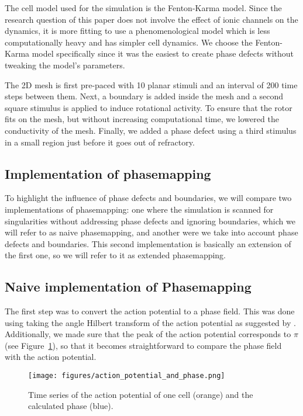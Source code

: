 \documentclass[twocolumn]{article}
\begin{document}
The cell model used for the simulation is the Fenton-Karma model. Since
the research question of this paper does not involve the effect of ionic
channels on the dynamics, it is more fitting to use a phenomenological
model which is less computationally heavy and has simpler cell dynamics.
We choose the Fenton-Karma model specifically since it was the easiest
to create phase defects without tweaking the model's parameters.

The 2D mesh is first pre-paced with 10 planar stimuli and an interval of
200 time steps between them. Next, a boundary is added inside the mesh
and a second square stimulus is applied to induce rotational activity.
To ensure that the rotor fits on the mesh, but without increasing
computational time, we lowered the conductivity of the mesh. Finally, we
added a phase defect using a third stimulus in a small region just
before it goes out of refractory.

\subsection{Implementation of phasemapping}

To highlight the influence of phase defects and boundaries, we will
compare two implementations of phasemapping: one where the simulation is
scanned for singularities without addressing phase defects and ignoring
boundaries, which we will refer to as naive phasemapping, and another
were we take into account phase defects and boundaries. This second
implementation is basically an extension of the first one, so we will
refer to it as extended phasemapping.

\subsection{Naive implementation of Phasemapping}

The first step was to convert the action potential to a phase field.
This was done using taking the angle Hilbert transform of the action
potential as suggested by \autocite{bray2002considerations}. Additionally,
we made sure that the peak of the action potential corresponds to
\(\pi\) (see Figure~\ref{fig:action_potential_and_phase}),
so that it becomes straightforward to compare the phase field with
the action potential.

\begin{figure}[ht]
  \begin{center}
    \texttt{[image: figures/action\_potential\_and\_phase.png]}
  \end{center}
  \caption{
    Time series of the action potential of one cell (orange)
    and the calculated phase (blue).
  }\label{fig:action_potential_and_phase}
\end{figure}
\end{document}
